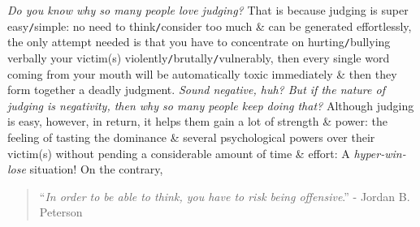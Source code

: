 \documentclass[12pt]{article}
\begin{document}
{\it Do you know why so many people love judging?} That is because judging is super easy{\tt/}simple: no need to think{\tt/}consider too much \& can be generated effortlessly, the only attempt needed is that you have to concentrate on hurting{\tt/}bullying verbally your victim(s) violently{\tt/}brutally{\tt/}vulnerably, then every single word coming from your mouth will be automatically toxic immediately \& then they form together a deadly judgment. {\it Sound negative, huh? But if the nature of judging is negativity, then why so many people keep doing that?} Although judging is easy, however, in return, it helps them gain a lot of strength \& power: the feeling of tasting the dominance \& several psychological powers over their victim(s) without pending a considerable amount of time \& effort: A {\it hyper-win-lose} situation! On the contrary,
\begin{quotation}
	``{\it In order to be able to think, you have to risk being offensive}.'' - {\sc Jordan B. Peterson}
\end{quotation}
\end{document}
